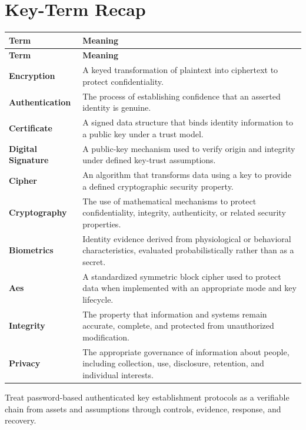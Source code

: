 \documentclass[11pt]{article}
\begin{document}
\section*{Key-Term Recap}
\begin{longtable}{>{\RaggedRight\arraybackslash}p{}>{\RaggedRight\arraybackslash}p{}}
\toprule\rowcolor{Navy}\color{white}\textbf{Term} & \color{white}\textbf{Meaning}\\\midrule
\endfirsthead
\toprule\rowcolor{Navy}\color{white}\textbf{Term} & \color{white}\textbf{Meaning}\\\midrule
\endhead
\textbf{Encryption} & A keyed transformation of plaintext into ciphertext to protect confidentiality. \\\midrule
\textbf{Authentication} & The process of establishing confidence that an asserted identity is genuine. \\\midrule
\textbf{Certificate} & A signed data structure that binds identity information to a public key under a trust model. \\\midrule
\textbf{Digital Signature} & A public-key mechanism used to verify origin and integrity under defined key-trust assumptions. \\\midrule
\textbf{Cipher} & An algorithm that transforms data using a key to provide a defined cryptographic security property. \\\midrule
\textbf{Cryptography} & The use of mathematical mechanisms to protect confidentiality, integrity, authenticity, or related security properties. \\\midrule
\textbf{Biometrics} & Identity evidence derived from physiological or behavioral characteristics, evaluated probabilistically rather than as a secret. \\\midrule
\textbf{Aes} & A standardized symmetric block cipher used to protect data when implemented with an appropriate mode and key lifecycle. \\\midrule
\textbf{Integrity} & The property that information and systems remain accurate, complete, and protected from unauthorized modification. \\\midrule
\textbf{Privacy} & The appropriate governance of information about people, including collection, use, disclosure, retention, and individual interests. \\\midrule
\bottomrule
\end{longtable}
\begin{takeawaybox}
Treat password-based authenticated key establishment protocols as a verifiable chain from assets and assumptions through controls, evidence, response, and recovery.
\end{takeawaybox}
\end{document}
